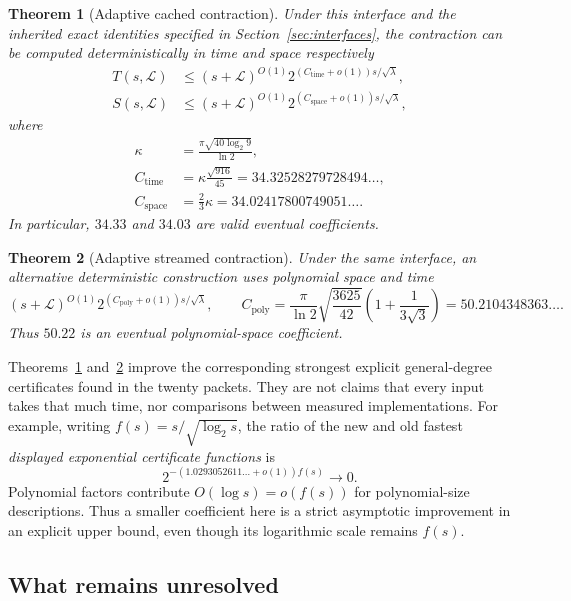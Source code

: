 \documentclass[11pt,letterpaper]{article}
\newtheorem{theorem}{Theorem}[section]
\theoremstyle{remark}\newtheorem{remark}[theorem]{Remark}
\newcommand{\CT}{C_{\mathrm{time}}}
\newcommand{\CS}{C_{\mathrm{space}}}
\newcommand{\CPS}{C_{\mathrm{poly}}}
\begin{document}
\begin{theorem}[Adaptive cached contraction]
\label{thm:main}
Under this interface and the inherited exact identities specified in
Section~\ref{sec:interfaces}, the contraction can be computed deterministically
in time and space respectively
\begin{align}
 T(s,\mathcal L)&\le(s+\mathcal L)^{O(1)}
 2^{(\CT+o(1))s/\sqrt\lambda},\label{eq:main-time}\\
 S(s,\mathcal L)&\le(s+\mathcal L)^{O(1)}
 2^{(\CS+o(1))s/\sqrt\lambda},\label{eq:main-space}
\end{align}
where
\begin{align*}
 \kappa&=\frac{\pi\sqrt{40\log_2 9}}{\ln2},\\
 \CT&=\kappa\frac{\sqrt{916}}{45}
      =34.32528279728494\ldots,\\
 \CS&=\frac23\kappa=34.02417800749051\ldots.
\end{align*}
In particular, $34.33$ and $34.03$ are valid eventual coefficients.
\end{theorem}

\begin{theorem}[Adaptive streamed contraction]
\label{thm:polyspace}
Under the same interface, an alternative deterministic construction uses
polynomial space and time
\[
 (s+\mathcal L)^{O(1)}2^{(\CPS+o(1))s/\sqrt\lambda},\qquad
 \CPS=\frac{\pi}{\ln2}\sqrt{\frac{3625}{42}}
       \left(1+\frac1{3\sqrt3}\right)
       =50.2104348363\ldots.
\]
Thus $50.22$ is an eventual polynomial-space coefficient.
\end{theorem}

Theorems~\ref{thm:main} and~\ref{thm:polyspace} improve the corresponding
strongest explicit general-degree certificates found in the twenty packets.
They are not claims that every input takes that much time, nor comparisons
between measured implementations.
For example, writing $f(s)=s/\sqrt{\log_2s}$, the ratio of the new and old
fastest \emph{displayed exponential certificate functions} is
\[
 2^{-(1.0293052611\ldots+o(1))f(s)}\longrightarrow0.
\]
Polynomial factors contribute $O(\log s)=o(f(s))$ for polynomial-size
descriptions. Thus a smaller coefficient here is a strict asymptotic
improvement in an explicit upper bound, even though its logarithmic scale
remains $f(s)$.

\subsection{What remains unresolved}
\end{document}
